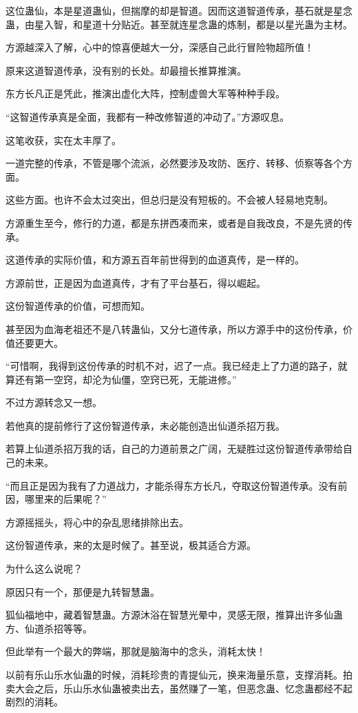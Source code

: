 \begin{this_body}
这位蛊仙，本是星道蛊仙，但揣摩的却是智道。因而这道智道传承，基石就是星念蛊，由星入智，和星道十分贴近。甚至就连星念蛊的炼制，都是以星光蛊为主材。

方源越深入了解，心中的惊喜便越大一分，深感自己此行冒险物超所值！

原来这道智道传承，没有别的长处。却最擅长推算推演。

东方长凡正是凭此，推演出虚化大阵，控制虚兽大军等种种手段。

“这智道传承真是全面，我都有一种改修智道的冲动了。”方源叹息。

这笔收获，实在太丰厚了。

一道完整的传承，不管是哪个流派，必然要涉及攻防、医疗、转移、侦察等各个方面。

这些方面。也许不会太过突出，但总归是没有短板的。不会被人轻易地克制。

方源重生至今，修行的力道，都是东拼西凑而来，或者是自我改良，不是先贤的传承。

这道传承的实际价值，和方源五百年前世得到的血道真传，是一样的。

方源前世，正是因为血道真传，才有了平台基石，得以崛起。

这份智道传承的价值，可想而知。

甚至因为血海老祖还不是八转蛊仙，又分七道传承，所以方源手中的这份传承，价值还要更大。

“可惜啊，我得到这份传承的时机不对，迟了一点。我已经走上了力道的路子，就算还有第一空窍，却沦为仙僵，空窍已死，无能进修。”

不过方源转念又一想。

若他真的提前修行了这份智道传承，未必能创造出仙道杀招万我。

若算上仙道杀招万我的话，自己的力道前景之广阔，无疑胜过这份智道传承带给自己的未来。

“而且正是因为我有了力道战力，才能杀得东方长凡，夺取这份智道传承。没有前因，哪里来的后果呢？”

方源摇摇头，将心中的杂乱思绪排除出去。

这份智道传承，来的太是时候了。甚至说，极其适合方源。

为什么这么说呢？

原因只有一个，那便是九转智慧蛊。

狐仙福地中，藏着智慧蛊。方源沐浴在智慧光晕中，灵感无限，推算出许多仙蛊方、仙道杀招等等。

但此举有一个最大的弊端，那就是脑海中的念头，消耗太快！

以前有乐山乐水仙蛊的时候，消耗珍贵的青提仙元，换来海量乐意，支撑消耗。拍卖大会之后，乐山乐水仙蛊被卖出去，虽然赚了一笔，但恶念蛊、忆念蛊都经不起剧烈的消耗。


\end{this_body}
